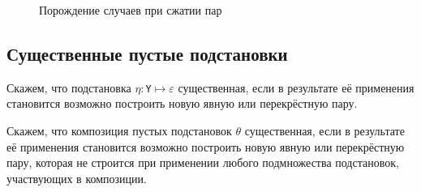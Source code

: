 \documentclass[12pt]{article}
\begin{document}
\begin{figure}[!htb]
{
}
\caption{Порождение случаев при сжатии пар}
\label{fig::test2}
\end{figure}
 
 \medskip
\subsection{Существенные пустые подстановки}

Скажем, что подстановка $\eta:$\verb|Y|$\mapsto\varepsilon$ существенная, если в результате её применения становится возможно построить новую явную или перекрёстную пару.

Скажем, что композиция пустых подстановок $\theta$ существенная, если в результате её применения становится возможно построить новую явную или перекрёстную пару, которая не строится при применении любого подмножества подстановок, участвующих в композиции.
\end{document}
